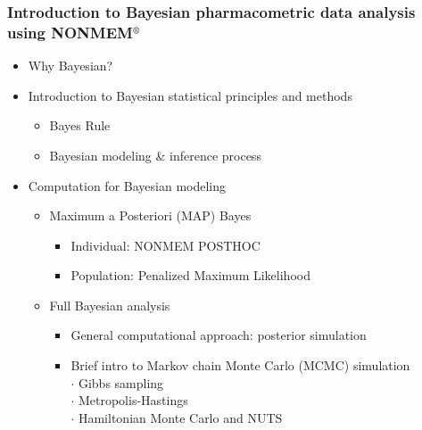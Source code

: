 \documentclass{beamer}
\begin{document}
\begin{frame}
  \frametitle{Introduction to Bayesian pharmacometric data analysis
    using NONMEM$^\text{\textregistered}$}
  
  \begin{itemize}
\item Why Bayesian?
  \item Introduction to Bayesian statistical principles and methods
    \begin{itemize}
    \item Bayes Rule
    \item Bayesian modeling \& inference process
    \end{itemize}
  \item Computation for Bayesian modeling
    \begin{itemize}
    \item Maximum a Posteriori (MAP) Bayes
      \begin{itemize}
      \item Individual: NONMEM POSTHOC
      \item Population: Penalized Maximum Likelihood
      \end{itemize}
    \item Full Bayesian analysis
      \begin{itemize}
      \item General computational approach: posterior simulation
      \item Brief intro to Markov chain Monte Carlo (MCMC) simulation \\
        \hspace{1em} $\cdot$ Gibbs sampling \\
        \hspace{1em} $\cdot$ Metropolis-Hastings \\
        \hspace{1em} $\cdot$ Hamiltonian Monte Carlo and NUTS
      \end{itemize}
    \end{itemize}
  \end{itemize}

\end{frame}
\end{document}

